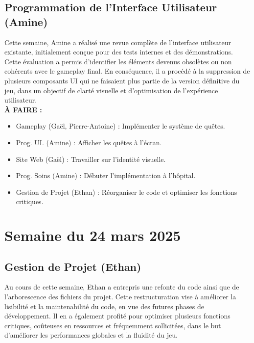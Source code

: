 \documentclass{report}
\begin{document}
\subsection*{Programmation de l’Interface Utilisateur (Amine)}
Cette semaine, Amine a réalisé une revue complète de l’interface utilisateur existante, initialement conçue pour des tests internes et des démonstrations. Cette évaluation a permis d’identifier les éléments devenus obsolètes ou non cohérents avec le gameplay final. En conséquence, il a procédé à la suppression de plusieurs composants UI qui ne faisaient plus partie de la version définitive du jeu, dans un objectif de clarté visuelle et d’optimisation de l’expérience utilisateur.
\\[1cm]
\textbf{À FAIRE :}
\begin{itemize}
    \item Gameplay (Gaël, Pierre-Antoine) : Implémenter le système de quêtes.
    \item Prog. UI. (Amine) : Afficher les quêtes à l’écran.
    \item Site Web (Gaël) : Travailler sur l’identité visuelle.
    \item Prog. Soins (Amine) : Débuter l’implémentation à l’hôpital.
    \item Gestion de Projet (Ethan) : Réorganiser le code et optimiser les fonctions critiques.
\end{itemize}


\newpage
\section{Semaine du 24 mars 2025}

\subsection*{Gestion de Projet (Ethan)}
Au cours de cette semaine, Ethan a entrepris une refonte du code ainsi que de l’arborescence des fichiers du projet. Cette restructuration vise à améliorer la lisibilité et la maintenabilité du code, en vue des futures phases de développement. Il en a également profité pour optimiser plusieurs fonctions critiques, coûteuses en ressources et fréquemment sollicitées, dans le but d’améliorer les performances globales et la fluidité du jeu.
\end{document}
